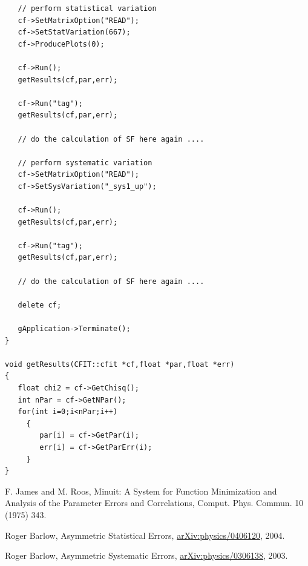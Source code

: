 \documentclass[12pt]{article}
\begin{document}
\begin{verbatim}
   // perform statistical variation
   cf->SetMatrixOption("READ");
   cf->SetStatVariation(667);
   cf->ProducePlots(0);
   
   cf->Run();
   getResults(cf,par,err);

   cf->Run("tag");
   getResults(cf,par,err);
   
   // do the calculation of SF here again ....
   
   // perform systematic variation
   cf->SetMatrixOption("READ");
   cf->SetSysVariation("_sys1_up");

   cf->Run();
   getResults(cf,par,err);

   cf->Run("tag");
   getResults(cf,par,err);
   
   // do the calculation of SF here again ....
   
   delete cf;
   
   gApplication->Terminate();
}

void getResults(CFIT::cfit *cf,float *par,float *err)
{   
   float chi2 = cf->GetChisq();
   int nPar = cf->GetNPar();
   for(int i=0;i<nPar;i++)
     {
        par[i] = cf->GetPar(i);
        err[i] = cf->GetParErr(i);	
     }
}
\end{verbatim}

\begin{thebibliography}{9}

F. James and M. Roos,
Minuit: A System for Function Minimization and Analysis of the
Parameter Errors and Correlations,
Comput. Phys. Commun. 10 (1975) 343.

Roger Barlow,
Asymmetric Statistical Errors,
\url{arXiv:physics/0406120},
2004.

Roger Barlow, 
Asymmetric Systematic Errors,
\url{arXiv:physics/0306138},
2003.

\end{thebibliography}
\end{document}
